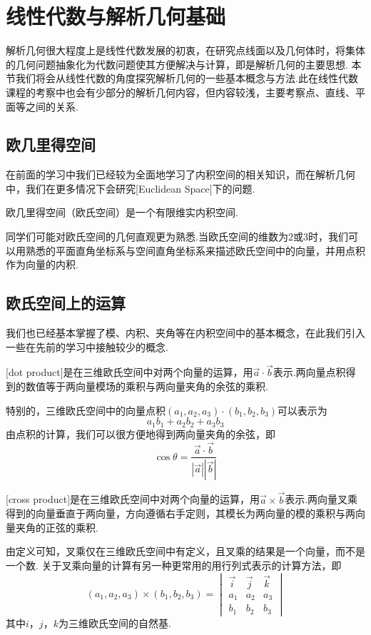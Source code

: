 \chapter{线性代数与解析几何基础}

解析几何很大程度上是线性代数发展的初衷，在研究点线面以及几何体时，将集体的几何问题抽象化为代数问题使其方便解决与计算，即是解析几何的主要思想.
本节我们将会从线性代数的角度探究解析几何的一些基本概念与方法.此在线性代数课程的考察中也会有少部分的解析几何内容，但内容较浅，主要考察点、直线、平面等之间的关系.
\section{欧几里得空间}
在前面的学习中我们已经较为全面地学习了内积空间的相关知识，而在解析几何中，我们在更多情况下会研究[Euclidean Space]下的问题.
\begin{definition}[欧几里得空间]
    欧几里得空间（欧氏空间）是一个有限维实内积空间.
\end{definition}
同学们可能对欧氏空间的几何直观更为熟悉.当欧氏空间的维数为$2$或$3$时，我们可以用熟悉的平面直角坐标系与空间直角坐标系来描述欧氏空间中的向量，并用点积作为向量的内积.
\section{欧氏空间上的运算}
我们也已经基本掌握了模、内积、夹角等在内积空间中的基本概念，在此我们引入一些在先前的学习中接触较少的概念.
\begin{definition}
    [dot product]是在三维欧氏空间中对两个向量的运算，用$\vec{a}\cdot\vec{b}$表示.两向量点积得到的数值等于两向量模场的乘积与两向量夹角的余弦的乘积.
\end{definition}
特别的，三维欧氏空间中的向量点积$(a_1,a_2,a_3)\cdot(b_1,b_2,b_3)$可以表示为$$a_1b_1+a_2b_2+a_3b_3$$
由点积的计算，我们可以很方便地得到两向量夹角的余弦，即$$\cos\theta=\frac{\vec{a}\cdot\vec{b}}{|\vec{a}||\vec{b}|}$$
\begin{definition}
    [cross product]是在三维欧氏空间中对两个向量的运算，用$\vec{a}\times\vec{b}$表示.两向量叉乘得到的向量垂直于两向量，方向遵循右手定则，其模长为两向量的模的乘积与两向量夹角的正弦的乘积.
\end{definition}
由定义可知，叉乘仅在三维欧氏空间中有定义，且叉乘的结果是一个向量，而不是一个数.
关于叉乘向量的计算有另一种更常用的用行列式表示的计算方法，即
$$(a_1,a_2,a_3)\times(b_1,b_2,b_3)=\begin{vmatrix}
    \vec{i}&\vec{j}&\vec{k}\\
    a_1&a_2&a_3\\
    b_1&b_2&b_3
\end{vmatrix}$$
其中$i$，$j$，$k$为三维欧氏空间的自然基.

